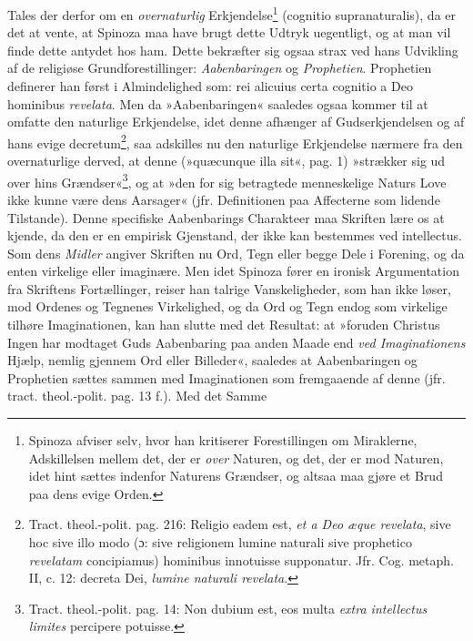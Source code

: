 \documentclass[12pt,a4paper]{book}
\newcommand{\opage}[1]{\marginnote{\footnotesize\textit{[#1]}}}
\begin{document}
Tales der derfor om en \emph{overnaturlig} Erkjendelse\footnote{Spinoza afviser selv, hvor han kritiserer Forestillingen om Miraklerne, Adskillelsen mellem det, der er \emph{over} Naturen, og det, der er mod Naturen, idet hint sættes indenfor Naturens Grændser, og altsaa maa gjøre et Brud paa dens evige Orden.} (cognitio supranaturalis), da er det at vente, at Spinoza maa
\opage{149} \setcounter{footnote}{0}%
have brugt dette Udtryk uegentligt, og at man vil finde dette antydet hos ham. Dette bekræfter sig ogsaa strax ved hans Udvikling af de religiøse Grundforestillinger: \emph{Aabenbaringen} og \emph{Prophetien}. Prophetien definerer han først i Almindelighed som: rei alicuius certa cognitio a Deo hominibus \emph{revelata}. Men da »Aabenbaringen« saaledes ogsaa kommer til at omfatte den naturlige Erkjendelse, idet denne afhænger af Gudserkjendelsen og af hans evige decretum\footnote{Tract. theol.-polit. pag. 216: Religio eadem est, \emph{et a Deo æque revelata}, sive hoc sive illo modo (ɔ: sive religionem lumine naturali sive prophetico \emph{revelatam} concipiamus) hominibus innotuisse supponatur. Jfr. Cog. metaph. II, c. 12: decreta Dei, \emph{lumine naturali revelata}.}, saa adskilles nu den naturlige Erkjendelse nærmere fra den overnaturlige derved, at denne (»quæcunque illa sit«, pag. 1) »strækker sig ud over hins Grændser«\footnote{Tract. theol.-polit. pag. 14: Non dubium est, eos multa \emph{extra intellectus limites} percipere potuisse.}, og at »den for sig betragtede menneskelige Naturs Love ikke kunne være dens Aarsager« (jfr. Definitionen paa Affecterne som lidende Tilstande). Denne specifiske Aabenbarings Charakteer maa Skriften lære os at kjende, da den er en empirisk Gjenstand, der ikke kan bestemmes ved intellectus. Som dens \emph{Midler} angiver Skriften nu Ord, Tegn eller begge Dele i Forening, og da enten virkelige eller imaginære. Men idet Spinoza fører en ironisk Argumentation fra Skriftens Fortællinger, reiser han talrige Vanskeligheder, som han ikke løser, mod Ordenes og Tegnenes Virkelighed, og da Ord og Tegn endog som virkelige tilhøre Imaginationen, kan han slutte med det Resultat: at »foruden Christus Ingen har modtaget Guds Aabenbaring paa anden Maade end \emph{ved Imaginationens} Hjælp, nemlig gjennem Ord eller Billeder«, saaledes at Aabenbaringen og Prophetien sættes sammen med Imaginationen som fremgaaende af denne (jfr. tract. theol.-polit. pag. 13 f.). Med det Samme
\opage{150} \setcounter{footnote}{0}%
\end{document}
